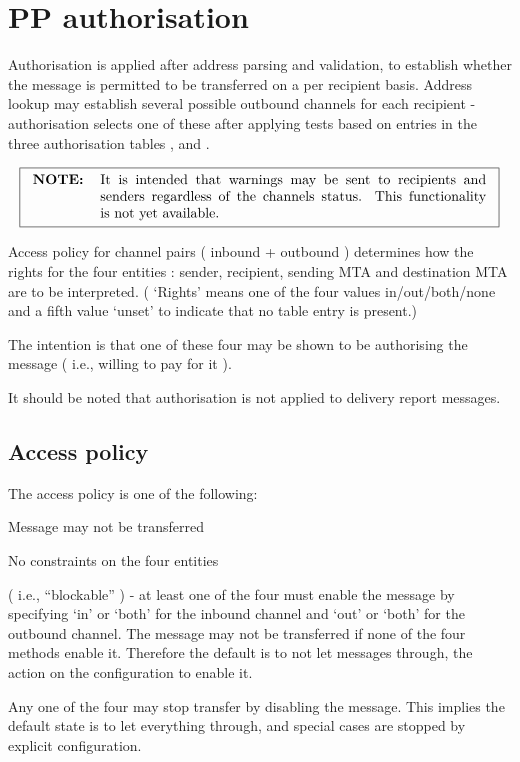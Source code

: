 \section{PP authorisation}\label{sect:auth}

Authorisation is applied after address parsing and validation, to
establish whether the message is permitted to be transferred on a per
recipient basis.  Address lookup may establish several possible
outbound channels for each recipient - authorisation selects one of
these after applying tests based on entries in the three authorisation
tables ,  and .

\[\fbox{\begin{tabular}{l p{0.8\textwidth}}
\bf NOTE: &
It is intended that warnings may be sent to recipients and senders
regardless of the channels status. This functionality is not yet
available.
\end{tabular}}\]

Access policy for channel pairs ( inbound + outbound ) determines how
the rights for the four entities : sender, recipient, sending MTA and
destination MTA are to be interpreted.  ( `Rights' means one of the
four values in/out/both/none and a fifth value `unset' to indicate
that no table entry is present.)

The intention is that one of these four may be shown to be authorising
the message ( i.e., willing to pay for it ).

It should be noted that authorisation is not applied to delivery report
messages. 

\subsection{Access policy}
The access policy is one of the following:
\begin{describe}
\item[\verb|none|:]
Message may not be transferred

\item[\verb|free|:]
No constraints on the four entities

\item[\verb|block|:]
( i.e., ``blockable'' ) - at least one of the four must enable the
message by specifying `in' or `both' for the inbound channel and `out'
or `both' for the outbound channel.  The message may not be
transferred if none of the four methods enable it. Therefore the
default is to not let messages through, the action on the configuration to
enable it.

\item[\verb|negative|:]
Any one of the four may stop transfer by disabling the
message. This implies the default state is to let everything through,
and special cases are stopped by explicit configuration.

\end{describe}

